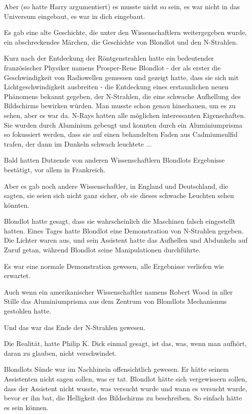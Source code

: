 Aber (so hatte Harry argumentiert) es musste nicht so sein, es war nicht in das
Universum eingebaut, es war in dich eingebaut.

Es gab eine alte Geschichte, die unter den Wissenschaftlern weitergegeben wurde,
ein abschreckendes Märchen, die Geschichte von Blondlot und den N-Strahlen.

Kurz nach der Entdeckung der Röntgenstrahlen hatte ein bedeutender französischer
Physiker namens Prosper-Rene Blondlot - der als erster die Geschwindigkeit von
Radiowellen gemessen und gezeigt hatte, dass sie sich mit Lichtgeschwindigkeit
ausbreiten - die Entdeckung eines erstaunlichen neuen Phänomens bekannt gegeben,
der N-Strahlen, die eine schwache Aufhellung des Bildschirms bewirken würden.
Man musste schon genau hinschauen, um es zu sehen, aber es war da. N-Rays hatten
alle möglichen interessanten Eigenschaften. Sie wurden durch Aluminium gebeugt
und konnten durch ein Aluminiumprisma so fokussiert werden, dass sie auf einen
behandelten Faden aus Cadmiumsulfid trafen, der dann im Dunkeln schwach
leuchtete ...

Bald hatten Dutzende von anderen Wissenschaftlern Blondlots Ergebnisse
bestätigt, vor allem in Frankreich.

Aber es gab noch andere Wissenschaftler, in England und Deutschland, die sagten,
sie seien sich nicht ganz sicher, ob sie dieses schwache Leuchten sehen könnten.

Blondlot hatte gesagt, dass sie wahrscheinlich die Maschinen falsch eingestellt
hatten. Eines Tages hatte Blondlot eine Demonstration von N-Strahlen gegeben.
Die Lichter waren aus, und sein Assistent hatte das Aufhellen und Abdunkeln auf
Zuruf getan, während Blondlot seine Manipulationen durchführte.

Es war eine normale Demonstration gewesen, alle Ergebnisse verliefen wie
erwartet.

Auch wenn ein amerikanischer Wissenschaftler namens Robert Wood in aller Stille
das Aluminiumprisma aus dem Zentrum von Blondlots Mechanismus gestohlen hatte.

Und das war das Ende der N-Strahlen gewesen.

Die Realität, hatte Philip K. Dick einmal gesagt, ist das, was, wenn man
aufhört, daran zu glauben, nicht verschwindet.

Blondlots Sünde war im Nachhinein offensichtlich gewesen. Er hätte seinem
Assistenten nicht sagen sollen, was er tat. Blondlot hätte sich vergewissern
sollen, dass der Assistent nicht wusste, was versucht wurde und wann es versucht
wurde, bevor er ihn bat, die Helligkeit des Bildschirms zu beschreiben. So
einfach hätte es sein können.

